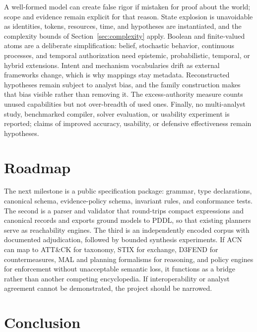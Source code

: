 \documentclass[11pt,letterpaper]{article}
\theoremstyle{definition}
\begin{document}
A well-formed model can create false rigor if mistaken for proof about the world; scope and evidence remain explicit for that reason. State explosion is unavoidable as identities, tokens, resources, time, and hypotheses are instantiated, and the complexity bounds of Section~\ref{sec:complexity} apply. Boolean and finite-valued atoms are a deliberate simplification: belief, stochastic behavior, continuous processes, and temporal authorization need epistemic, probabilistic, temporal, or hybrid extensions. Intent and mechanism vocabularies drift as external frameworks change, which is why mappings stay metadata. Reconstructed hypotheses remain subject to analyst bias, and the family construction makes that bias visible rather than removing it. The excess-authority measure counts unused capabilities but not over-breadth of used ones. Finally, no multi-analyst study, benchmarked compiler, solver evaluation, or usability experiment is reported; claims of improved accuracy, usability, or defensive effectiveness remain hypotheses.

\section{Roadmap}\label{sec:roadmap}

The next milestone is a public specification package: grammar, type declarations, canonical schema, evidence-policy schema, invariant rules, and conformance tests. The second is a parser and validator that round-trips compact expressions and canonical records and exports ground models to PDDL, so that existing planners serve as reachability engines. The third is an independently encoded corpus with documented adjudication, followed by bounded synthesis experiments. If ACN can map to ATT\&CK for taxonomy, STIX for exchange, D3FEND for countermeasures, MAL and planning formalisms for reasoning, and policy engines for enforcement without unacceptable semantic loss, it functions as a bridge rather than another competing encyclopedia. If interoperability or analyst agreement cannot be demonstrated, the project should be narrowed.

\section{Conclusion}
\end{document}
